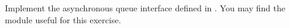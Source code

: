 \documentclass{pset}
\begin{document}
\exercise{}

Implement the asynchronous queue interface defined in .
You may find the  module useful for this exercise.

% 
% 
% 
% 
% 
% 
% 
% 
% 
% 
% 
% 
% 
\newpage{}
\end{document}
